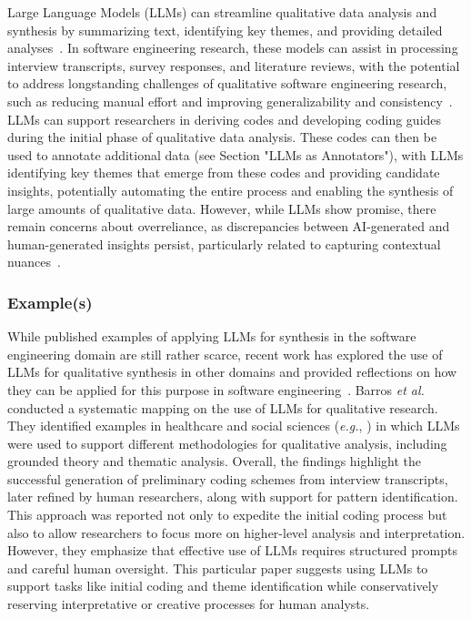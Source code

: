 \documentclass[11pt]{article}
\begin{document}
Large Language Models (LLMs) can streamline qualitative data analysis and synthesis by summarizing text, identifying key themes, and providing detailed analyses~\cite{DBLP:conf/chi/ByunVS23}. In software engineering research, these models can assist in processing interview transcripts, survey responses, and literature reviews, with the potential to address longstanding challenges of qualitative software engineering research, such as reducing manual effort and improving generalizability and consistency~\cite{DBLP:journals/ase/BanoHZT24}. LLMs can support researchers in deriving codes and developing coding guides during the initial phase of qualitative data analysis. These codes can then be used to annotate additional data (see Section "LLMs as Annotators"), with LLMs identifying key themes that emerge from these codes and providing candidate insights, potentially automating the entire process and enabling the synthesis of large amounts of qualitative data. However, while LLMs show promise, there remain concerns about overreliance, as discrepancies between AI-generated and human-generated insights persist, particularly related to capturing contextual nuances~\cite{bano2023exploringqualitativeresearchusing}.

\subsubsection{Example(s)} 

While published examples of applying LLMs for synthesis in the software engineering domain are still rather scarce, recent work has explored the use of LLMs for qualitative synthesis in other domains and provided reflections on how they can be applied for this purpose in software engineering~\cite{DBLP:journals/ase/BanoHZT24}. Barros \textit{et al.}~\cite{barros2024largelanguagemodelqualitative} conducted a systematic mapping on the use of LLMs for qualitative research. They identified examples in healthcare and social sciences (\textit{e.g.}, \cite{de2024performing,mathis2024inductive}) in which LLMs were used to support different methodologies for qualitative analysis, including grounded theory and thematic analysis. Overall, the findings highlight the successful generation of preliminary coding schemes from interview transcripts, later refined by human researchers, along with support for pattern identification. This approach was reported not only to expedite the initial coding process but also to allow researchers to focus more on higher-level analysis and interpretation. However, they emphasize that effective use of LLMs requires structured prompts and careful human oversight. This particular paper suggests using LLMs to support tasks like initial coding and theme identification while conservatively reserving interpretative or creative processes for human analysts.
\end{document}
